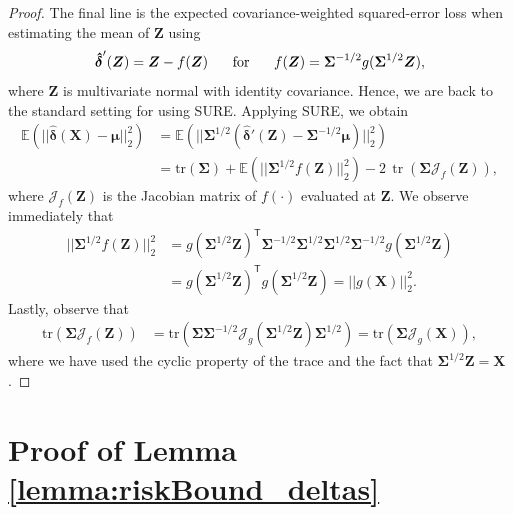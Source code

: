 \documentclass{article}
\newcommand{\bsX}{\boldsymbol X}
\newcommand{\bsZ}{\boldsymbol Z}
\newcommand{\bsmu}{\boldsymbol \mu}
\newcommand{\bsSigma}{\boldsymbol \Sigma}
\newcommand{\bsSig}{\boldsymbol  \Sigma}
\def\e{\mathbb{E}}
\newcommand{\Tr}{\text{tr}}
\newcommand{\bsdelt}{\boldsymbol{\hat \delta}}
\newcommand{\tran}{\mathsf{T}}
\begin{document}
\begin{proof}
The final line is the expected covariance-weighted squared-error loss when estimating the mean of $\bsZ$ using 
\[ \bsdelt'(\bsZ) = \bsZ - f(\bsZ) \hspace{5mm} \text{ for } \hspace{5mm} f(\bsZ) = \bsSigma^{-1/2} g(\bsSigma^{1/2} \bsZ), \]
where $\bsZ$ is multivariate normal with identity covariance. Hence, we are back to the standard setting for using SURE. Applying SURE, we obtain 
\begin{align*}
\e \left( || \bsdelt(\bsX) - \bsmu ||_2^2 \right) &= 
\e \left( || \bsSig^{1/2} \left(\bsdelt'(\bsZ) - \bsSigma^{-1/2} \bsmu\right) ||_2^2 \right) \\
&= \Tr(\bsSig) + \e \left( || \bsSig^{1/2} f(\bsZ) ||_2^2 \right) -
2\,\operatorname{tr}\!\left(\bsSig \mathcal{J}_f(\bsZ)\right),
\end{align*}
where $\mathcal{J}_{f}( \bsZ )$ is the Jacobian matrix of $f(\cdot)$ evaluated at $\bsZ$. We observe immediately that 
\begin{align*}
|| \bsSig^{1/2} f(\bsZ) ||_2^2 &= g(\bsSigma^{1/2} \bsZ)^\tran  \bsSigma^{-1/2} \bsSigma^{1/2} \bsSigma^{1/2} \bsSigma^{-1/2} g(\bsSigma^{1/2} \bsZ) \\
&= g(\bsSigma^{1/2} \bsZ)^\tran g(\bsSigma^{1/2} \bsZ) = ||g(\bsX)||_2^2.
\end{align*}
Lastly, observe that 
\begin{align*}
\Tr(\bsSig \mathcal{J}_f(\bsZ)) &= \Tr \left(\bsSig \bsSig^{-1/2}
\mathcal{J}_g(\bsSig^{1/2}\bsZ)
\bsSig^{1/2} \right) = \Tr \left(\bsSig 
\mathcal{J}_g(\bsX) \right),
\end{align*}
where we have used the cyclic property of the trace and the fact that $\bsSigma^{1/2} \bsZ = \bsX$.

\end{proof}


\section{Proof of Lemma \ref{lemma:riskBound_deltas}}\label{sec:proof_deltas}
\end{document}
